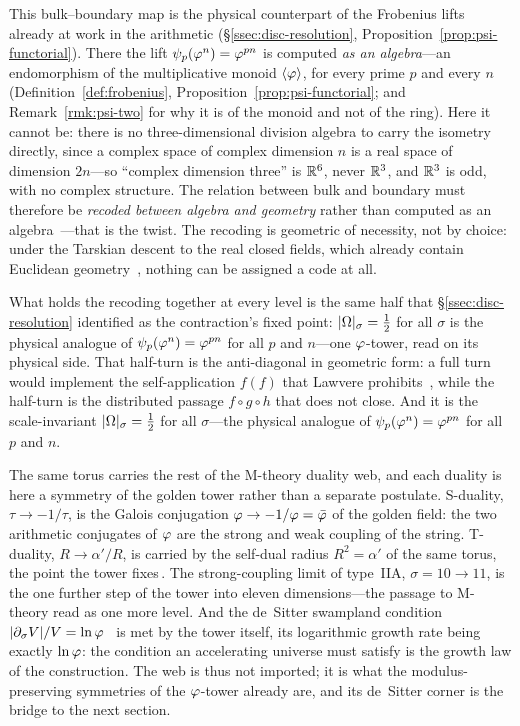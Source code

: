 This bulk--boundary map is the physical counterpart of the Frobenius lifts already at work in the arithmetic (\S\ref{ssec:disc-resolution},
Proposition~\ref{prop:psi-functorial}). There the lift $\psi_p(\varphi^n)=\varphi^{pn}$ is computed \emph{as an algebra}---an endomorphism
of the multiplicative monoid $\langle\varphi\rangle$, for every prime $p$ and every $n$
(Definition~\ref{def:frobenius}, Proposition~\ref{prop:psi-functorial}; and
Remark~\ref{rmk:psi-two} for why it is of the monoid and not of the ring). Here it cannot be: there is no three-dimensional division algebra to carry the isometry directly, since a complex space of complex dimension $n$ is a real space of dimension $2n$---so ``complex dimension three'' is $\mathbb{R}^6$, never $\mathbb{R}^3$, and $\mathbb{R}^3$ is odd, with no complex structure. The relation between bulk and boundary must therefore be \emph{recoded between algebra and geometry} rather than computed as an algebra~\cite{HP}---that is the twist. The recoding is geometric of necessity, not by choice: under the Tarskian descent to the real closed fields, which already contain Euclidean geometry~\cite{tarski52}, nothing can be assigned a code at all.

What holds the recoding together at every level is the same half that \S\ref{ssec:disc-resolution} identified as the contraction's fixed point: $|\Omega|_\sigma=\tfrac12$ for all $\sigma$ is the physical analogue of $\psi_p(\varphi^n)=\varphi^{pn}$ for all $p$ and $n$---one $\varphi$-tower, read on its physical side. That half-turn is the anti-diagonal in geometric form: a full turn would implement the self-application $f(f)$ that Lawvere prohibits~\cite{lawvere69}, while the half-turn is the distributed passage $f\circ g\circ h$ that does not close. And it is the scale-invariant $|\Omega|_\sigma=\tfrac12$ for all $\sigma$---the physical analogue of $\psi_p(\varphi^n)=\varphi^{pn}$ for all $p$ and $n$.

The same torus carries the rest of the M-theory duality web, and each duality is here a symmetry of the golden tower rather than a separate postulate. S-duality, $\tau\to-1/\tau$, is the Galois conjugation $\varphi\to-1/\varphi=\bar{\varphi}$ of the golden field: the two arithmetic conjugates of $\varphi$ are the strong and weak coupling of the string. T-duality, $R\to\alpha'/R$, is carried by the self-dual radius $R^{2}=\alpha'$ of the same torus, the point the tower fixes\,. The strong-coupling limit of type~IIA, $\sigma=10\to11$, is the one further step of the tower into eleven dimensions---the passage to M-theory read as one more level. And the de~Sitter swampland condition $|\partial_\sigma V|/V=\ln\varphi$~\cite{Obied18} is met by the tower itself, its logarithmic growth rate being exactly $\ln\varphi$: the condition an accelerating universe must satisfy is the growth law of the construction. The web is thus not imported; it is what the modulus-preserving symmetries of the $\varphi$-tower already are, and its de~Sitter corner is the bridge to the next section.

